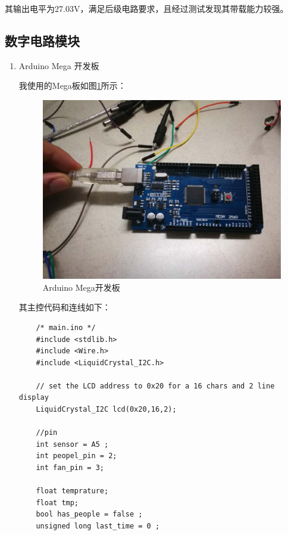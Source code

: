 \documentclass{article}
\begin{document}
\begin{spacing}{1.5}
\begin{enumerate}
    其输出电平为27.03V，满足后级电路要求，且经过测试发现其带载能力较强。

\end{enumerate}

    \subsection{数字电路模块}
\begin{enumerate}

    \item Arduino Mega 开发板
    
    我使用的Mega板如图\ref{fig:module6}所示：
    \begin{figure}[H]
        \centering
        \includegraphics[scale=0.1]{fig/result/module6.png}
        \caption{Arduino Mega开发板}
        \label{fig:module6}
    \end{figure}
    
    其主控代码和连线如下：

\begin{lstlisting}
    /* main.ino */
    #include <stdlib.h> 
    #include <Wire.h>
    #include <LiquidCrystal_I2C.h>
    
    // set the LCD address to 0x20 for a 16 chars and 2 line display
    LiquidCrystal_I2C lcd(0x20,16,2);  
    
    //pin 
    int sensor = A5 ;
    int peopel_pin = 2; 
    int fan_pin = 3;
    
    float temprature;
    float tmp; 
    bool has_people = false ; 
    unsigned long last_time = 0 ;
    

\end{lstlisting}
\end{enumerate}
\end{spacing}
\end{document}
